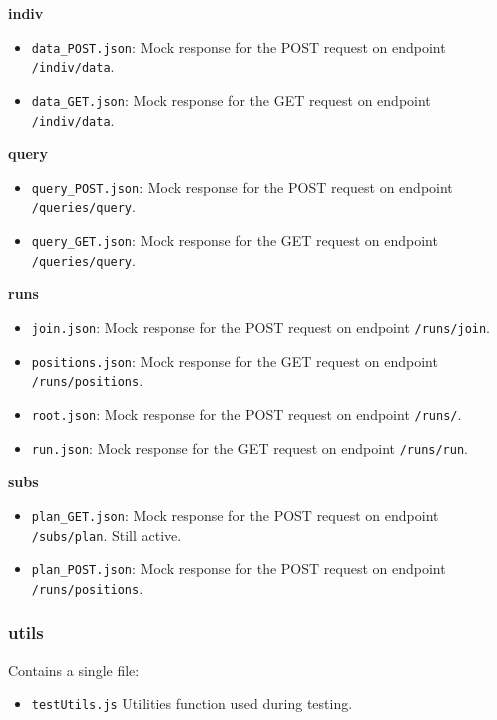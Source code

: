 \noindent \textbf{indiv}
\begin{itemize}
    \item \texttt{data\_POST.json}: Mock response for the POST request on endpoint \texttt{/indiv/data}.
    \item \texttt{data\_GET.json}: Mock response for the GET request on endpoint \texttt{/indiv/data}.
\end{itemize}

\noindent \textbf{query}
\begin{itemize}
    \item \texttt{query\_POST.json}: Mock response for the POST request on endpoint \texttt{/queries/query}.
    \item \texttt{query\_GET.json}: Mock response for the GET request on endpoint \texttt{/queries/query}.
\end{itemize}


\noindent \textbf{runs}
\begin{itemize}
    \item \texttt{join.json}: Mock response for the POST request on endpoint \texttt{/runs/join}.
    \item \texttt{positions.json}: Mock response for the GET request on endpoint \texttt{/runs/positions}.
     \item \texttt{root.json}: Mock response for the POST request on endpoint \texttt{/runs/}.
    \item \texttt{run.json}: Mock response for the GET request on endpoint \texttt{/runs/run}.
\end{itemize}

\noindent \textbf{subs}
\begin{itemize}
     \item \texttt{plan\_GET.json}: Mock response for the POST request on endpoint \texttt{/subs/plan}. Still active.
    \item \texttt{plan\_POST.json}: Mock response for the POST request on endpoint \texttt{/runs/positions}.
\end{itemize}

\subsubsection{utils}
Contains a single file: 
\begin{itemize}
    \item \texttt{testUtils.js} Utilities function used during testing.
\end{itemize}


